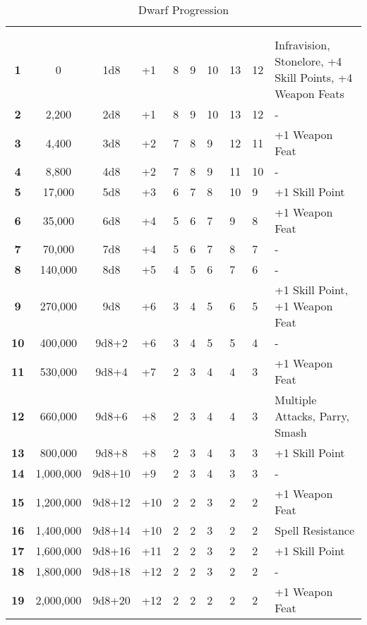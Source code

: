 \begin {table}[H]
  \caption{Dwarf Progression}
	\begin{tabularx}{\columnwidth}{>{\bfseries}cccM{.31in}M{.51in}M{.25in}M{.43in}M{.32in}M{.45in}Y}
    \thead{}&\thead{}&\thead{}&\thead{}&\thead{}&\setcounter{rownum}{0}\\
     &  &  &  &  &  &  &  &  & \\
		1 & 0 & 1d8 & +1 & 8 & 9 & 10 & 13 & 12 & Infravision, Stonelore, +4 Skill Points, +4 Weapon Feats\\
		2 & 2,200 & 2d8 & +1 & 8 & 9 & 10 & 13 & 12 & -\\
		3 & 4,400 & 3d8 & +2 & 7 & 8 & 9 & 12 & 11 & +1 Weapon Feat\\
		4 & 8,800 & 4d8 & +2 & 7 & 8 & 9 & 11 & 10 & -\\
		5 & 17,000 & 5d8 & +3 & 6 & 7 & 8 & 10 & 9 & +1 Skill Point\\
		6 & 35,000 & 6d8 & +4 & 5 & 6 & 7 & 9 & 8 & +1 Weapon Feat\\
		7 & 70,000 & 7d8 & +4 & 5 & 6 & 7 & 8 & 7 & -\\
		8 & 140,000 & 8d8 & +5 & 4 & 5 & 6 & 7 & 6 & -\\
		9 & 270,000 & 9d8 & +6 & 3 & 4 & 5 & 6 & 5 & +1 Skill Point, +1 Weapon Feat\\
		10 & 400,000 & 9d8+2 & +6 & 3 & 4 & 5 & 5 & 4 & -\\
		11 & 530,000 & 9d8+4 & +7 & 2 & 3 & 4 & 4 & 3 & +1 Weapon Feat\\
		12 & 660,000 & 9d8+6 & +8 & 2 & 3 & 4 & 4 & 3 & Multiple Attacks, Parry, Smash\\
		13 & 800,000 & 9d8+8 & +8 & 2 & 3 & 4 & 3 & 3 & +1 Skill Point\\
		14 & 1,000,000 & 9d8+10 & +9 & 2 & 3 & 4 & 3 & 3 & -\\
		15 & 1,200,000 & 9d8+12 & +10 & 2 & 2 & 3 & 2 & 2 & +1 Weapon Feat\\
		16 & 1,400,000 & 9d8+14 & +10 & 2 & 2 & 3 & 2 & 2 & Spell Resistance\\
		17 & 1,600,000 & 9d8+16 & +11 & 2 & 2 & 3 & 2 & 2 & +1 Skill Point\\
		18 & 1,800,000 & 9d8+18 & +12 & 2 & 2 & 3 & 2 & 2 & -\\
		19 & 2,000,000 & 9d8+20 & +12 & 2 & 2 & 2 & 2 & 2 & +1 Weapon Feat\\

\end{tabularx}
\end{table}
